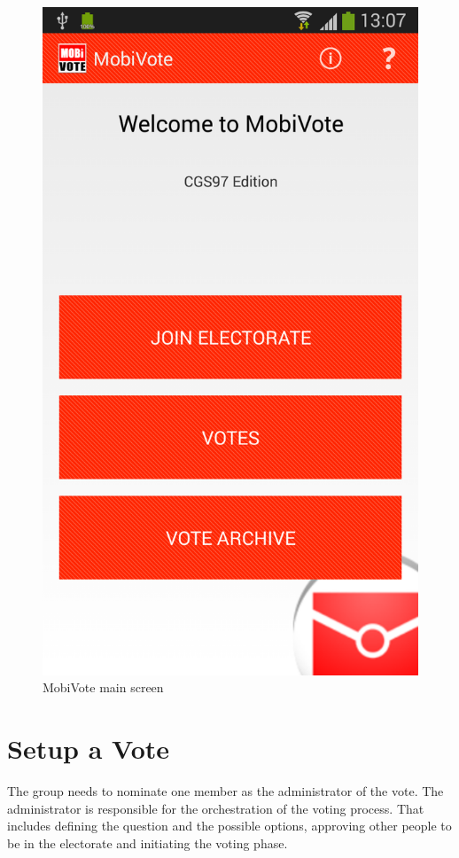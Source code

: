 \documentclass[numbers=noenddot, abstract=on, a4paper, headsepline,
footsepline, oneside, openright, draft=off, listof=leveldown]{scrreprt}
\begin{document}
\begin{figure}[!htb] \centering
\includegraphics[height=.4\textheight]{img/screenshots/main}
	\caption{MobiVote main screen}
	\label{fig:handbook_mainscreen}
\end{figure}

\section{Setup a Vote}
The group needs to nominate one member as the administrator of the vote. The
administrator is responsible for the orchestration of the voting process. That
includes defining the question and the possible options, approving other people
to be in the electorate and initiating the voting phase.
\end{document}
